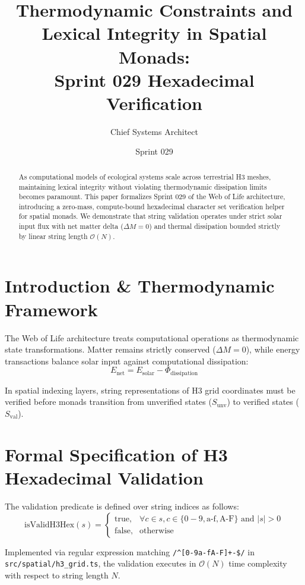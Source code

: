 \documentclass[11pt,article]{amsart}
\title{Thermodynamic Constraints and Lexical Integrity in Spatial Monads:\\Sprint 029 Hexadecimal Verification}
\author{Chief Systems Architect}
\date{Sprint 029}
\begin{document}
\maketitle

\begin{abstract}
As computational models of ecological systems scale across terrestrial H3 meshes, maintaining lexical integrity without violating thermodynamic dissipation limits becomes paramount. This paper formalizes Sprint 029 of the Web of Life architecture, introducing a zero-mass, compute-bound hexadecimal character set verification helper for spatial monads. We demonstrate that string validation operates under strict solar input flux with net matter delta ($\Delta M = 0$) and thermal dissipation bounded strictly by linear string length $\mathcal{O}(N)$.
\end{abstract}

\section{Introduction \& Thermodynamic Framework}
The Web of Life architecture treats computational operations as thermodynamic state transformations. Matter remains strictly conserved ($\Delta M = 0$), while energy transactions balance solar input against computational dissipation:
\begin{equation}
E_{\text{net}} = E_{\text{solar}} - \Phi_{\text{dissipation}}
\end{equation}

In spatial indexing layers, string representations of H3 grid coordinates must be verified before monads transition from unverified states ($S_{\text{unv}}$) to verified states ($S_{\text{val}}$).

\section{Formal Specification of H3 Hexadecimal Validation}
The validation predicate is defined over string indices as follows:
\begin{equation}
\text{isValidH3Hex}(s) = \begin{cases} 
\text{true}, & \forall c \in s, c \in \{0-9, \text{a-f}, \text{A-F}\} \text{ and } |s| > 0 \\ 
\text{false}, & \text{otherwise} 
\end{cases}
\end{equation}

Implemented via regular expression matching \texttt{/^[0-9a-fA-F]+-\$/} in \texttt{src/spatial/h3\_grid.ts}, the validation executes in $\mathcal{O}(N)$ time complexity with respect to string length $N$.
\end{document}
